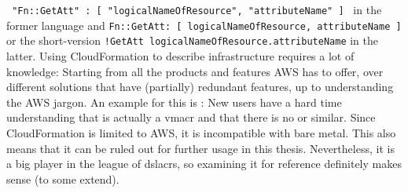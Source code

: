 \texttt{{ "Fn::GetAtt" : [ "logicalNameOfResource", "attributeName" ] }} in the former language and \texttt{Fn::GetAtt: [ logicalNameOfResource, attributeName ]} or the short-version
\newline %
\texttt{!GetAtt logicalNameOfResource.attributeName} in the latter.
\newline
Using CloudFormation to describe infrastructure requires a lot of knowledge: Starting from all the products and features AWS has to offer, over different solutions that have (partially) redundant features, up to understanding the AWS jargon. An example for this is : New users have a hard time understanding that  is actually a \gls{vmacr} and that there is no  or similar.
\newline
Since CloudFormation is limited to AWS, it is incompatible with bare metal. This also means that it can be ruled out for further usage in this thesis. Nevertheless, it is a big player in the league of \gls{dslacr}s, so examining it for reference definitely makes sense (to some extend).

